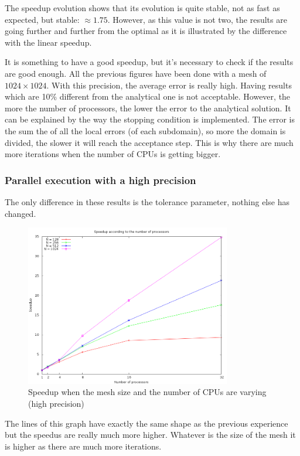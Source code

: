 \documentclass[a4paper,11pt]{article}
\begin{document}
The speedup evolution shows that its evolution is quite stable, not as fast as expected, but stable: $\approx 1.75$. However,
as this value is not two, the results are going further and further from the optimal as it is illustrated by the difference with the linear speedup.

It is something to have a good speedup, but it's necessary to check if the results are good enough. All the previous figures have been done
with a mesh of $1024 \times 1024$. With this precision, the average error is really high. Having results which are 10\% different from the
analytical one is not acceptable. However, the more the number of processors, the lower the error to the analytical solution.
It can be explained by the way the stopping condition is implemented. The error is the sum the of all the local errors (of each subdomain),
so more the domain is divided, the slower it will reach the acceptance step. This is why there are much more iterations when the number of CPUs is getting bigger. 

\subsubsection{Parallel execution with a high precision}

The only difference in these results is the tolerance parameter, nothing else has changed.

\begin{figure}[h!]
\centering
\includegraphics[width=0.8\textwidth]{./images/hprecision.png}
\caption{Speedup when the mesh size and the number of CPUs are varying (high precision)}
\end{figure}

The lines of this graph have exactly the same shape as the previous experience but the speedus are
really much more higher. Whatever is the size of the mesh it is higher as there are much more iterations.
\end{document}
